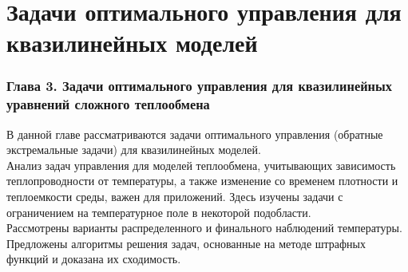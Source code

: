 \section{Задачи оптимального управления для квазилинейных моделей}\label{sec:opt}
\begin{frame}
    \frametitle{Глава 3. Задачи оптимального управления для квазилинейных уравнений сложного теплообмена}
    В данной главе рассматриваются задачи оптимального управления
    (обратные экстремальные задачи) для квазилинейных моделей.
    \\
    Анализ задач управления для моделей теплообмена, учитывающих зависимость
    теплопроводности от температуры, а также изменение со временем плотности
    и теплоемкости среды, важен для приложений.
    Здесь изучены задачи с ограничением на температурное поле в некоторой подобласти.
    \\
    Рассмотрены варианты распределенного и финального наблюдений температуры.
    \\
    Предложены алгоритмы решения задач, основанные на методе штрафных функций и доказана
    их сходимость.
\end{frame}

